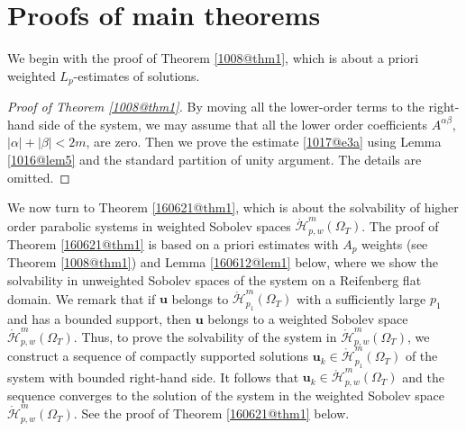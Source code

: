 \documentclass[reqno]{amsart}
\numberwithin{equation}{section}
\theoremstyle{plain}
\theoremstyle{definition}
\theoremstyle{remark}
\begin{document}
\section{Proofs of main theorems}	\label{160825@sec1}

We begin with the proof of Theorem \ref{1008@thm1}, which is about a priori weighted $L_p$-estimates of solutions.

\begin{proof}[Proof of Theorem \ref{1008@thm1}]
By moving all the lower-order terms to the right-hand side of the system, we may assume that  all the lower order coefficients $A^{\alpha\beta}$, $|\alpha|+|\beta|<2m$, are zero.
Then we prove the estimate \eqref{1017@e3a}  using Lemma \ref{1016@lem5} and the standard partition of unity argument.
The  details are omitted.
\end{proof}

We now turn to Theorem \ref{160621@thm1}, which is about the solvability of higher order parabolic systems in  weighted Sobolev spaces $\mathring{\mathcal{H}}^m_{p,w}(\Omega_T)$.
The proof of Theorem \ref{160621@thm1} is based on  a priori  estimates with $A_p$ weights (see Theorem \ref{1008@thm1}) and Lemma \ref{160612@lem1} below, where we show  the solvability in unweighted Sobolev spaces of the system on a Reifenberg flat domain.
We remark that if ${\boldsymbol{u}}$ belongs to $\mathring{\mathcal{H}}^m_{p_1}(\Omega_T)$ with a sufficiently large $p_1$ and has a bounded support, then ${\boldsymbol{u}}$ belongs to a weighted Sobolev space $\mathring{\mathcal{H}}^m_{p,w}(\Omega_T)$. 
Thus, to prove the solvability of the system in $\mathring{\mathcal{H}}^m_{p,w}(\Omega_T)$, we  construct a sequence  of   compactly supported solutions ${\boldsymbol{u}}_k\in \mathring{\mathcal{H}}^m_{p_1}(\Omega_T)$  of the system with bounded right-hand side. 
It follows that ${\boldsymbol{u}}_k\in \mathring{\mathcal{H}}^m_{p,w}(\Omega_T)$ and the sequence converges to the solution of the system in the weighted Sobolev space $\mathring{\mathcal{H}}^m_{p,w}(\Omega_T)$.
See the proof of Theorem \ref{160621@thm1} below.
\end{document}

